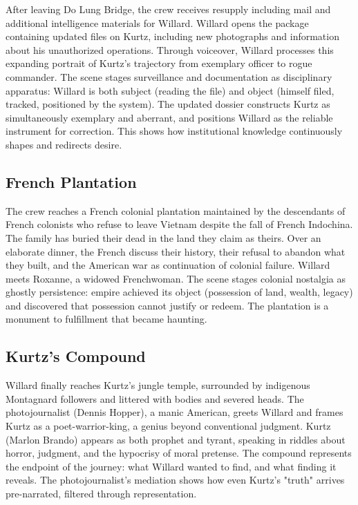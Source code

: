 After leaving Do Lung Bridge, the crew receives resupply including mail and additional
intelligence materials for Willard. Willard opens the package containing updated files on Kurtz,
including new photographs and information about his unauthorized operations. Through voiceover,
Willard processes this expanding portrait of Kurtz's trajectory from exemplary officer to rogue
commander. The scene stages surveillance and documentation as disciplinary apparatus: Willard is
both subject (reading the file) and object (himself filed, tracked, positioned by the system).
The updated dossier constructs Kurtz as simultaneously exemplary and aberrant, and positions
Willard as the reliable instrument for correction. This shows how institutional knowledge
continuously shapes and redirects desire.

\subsection*{French Plantation}
\label{scene:french-plantation}

The crew reaches a French colonial plantation maintained by the descendants of French colonists
who refuse to leave Vietnam despite the fall of French Indochina. The family has buried their
dead in the land they claim as theirs. Over an elaborate dinner, the French discuss their
history, their refusal to abandon what they built, and the American war as continuation of
colonial failure. Willard meets Roxanne, a widowed Frenchwoman. The scene stages colonial
nostalgia as ghostly persistence: empire achieved its object (possession of land, wealth,
legacy) and discovered that possession cannot justify or redeem. The plantation is a monument
to fulfillment that became haunting.

\subsection*{Kurtz's Compound}
\label{scene:kurtz-compound}

Willard finally reaches Kurtz's jungle temple, surrounded by indigenous Montagnard followers
and littered with bodies and severed heads. The photojournalist (Dennis Hopper), a manic
American, greets Willard and frames Kurtz as a poet-warrior-king, a genius beyond conventional
judgment. Kurtz (Marlon Brando) appears as both prophet and tyrant, speaking in riddles about
horror, judgment, and the hypocrisy of moral pretense. The compound represents the endpoint of
the journey: what Willard wanted to find, and what finding it reveals. The photojournalist's
mediation shows how even Kurtz's "truth" arrives pre-narrated, filtered through representation.

